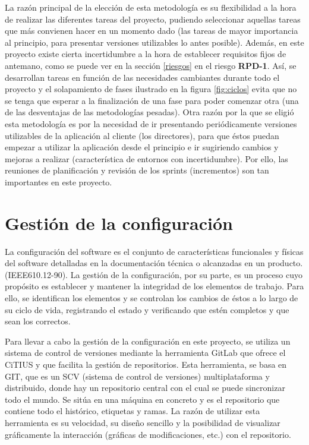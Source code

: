 \noindent
La razón principal de la elección de esta metodología es su flexibilidad a la hora de realizar las diferentes tareas del proyecto, pudiendo seleccionar aquellas tareas que más convienen hacer en un momento dado (las tareas de mayor importancia al principio, para presentar versiones utilizables lo antes posible). Además, en este proyecto existe cierta incertidumbre a la hora de establecer requisitos fijos de antemano, como se puede ver en la sección \ref{riesgos} en el riesgo \textbf{RPD-1}. Así, se desarrollan tareas en función de las necesidades cambiantes durante todo el proyecto y el solapamiento de fases ilustrado en la figura \ref{fig:ciclos} evita que no se tenga que esperar a la finalización de una fase para poder comenzar otra (una de las desventajas de las metodologías pesadas). Otra razón por la que se eligió esta metodología es por la necesidad de ir presentando periódicamente versiones utilizables de la aplicación al cliente (los directores), para que éstos puedan empezar a utilizar la aplicación desde el principio e ir sugiriendo cambios y mejoras a realizar (característica de entornos con incertidumbre). Por ello, las reuniones de planificación y revisión de los sprints (incrementos) son tan importantes en este proyecto.

\section{Gestión de la configuración}
La configuración del software es el conjunto de características funcionales y físicas del software detalladas en la documentación técnica o alcanzadas en un producto. (IEEE610.12-90). La gestión de la configuración, por su parte, es un proceso cuyo propósito es establecer y mantener la integridad de los elementos de trabajo. Para ello, se identifican los elementos y se controlan los cambios de éstos a lo largo de su ciclo de vida, registrando el estado y verificando que estén completos y que sean los correctos.

Para llevar a cabo la gestión de la configuración en este proyecto, se utiliza un sistema de control de versiones mediante la herramienta GitLab que ofrece el CiTIUS y que facilita la gestión de repositorios. Esta herramienta, se basa en GIT, que es un SCV (sistema de control de versiones) multiplataforma y distribuido, donde hay un repositorio central con el cual se puede sincronizar todo el mundo. Se sitúa en una máquina en concreto y es el repositorio que contiene todo el histórico, etiquetas y ramas. La razón de utilizar esta herramienta es su velocidad, su diseño sencillo y la posibilidad de visualizar gráficamente la interacción (gráficas de modificaciones, etc.) con el repositorio.

